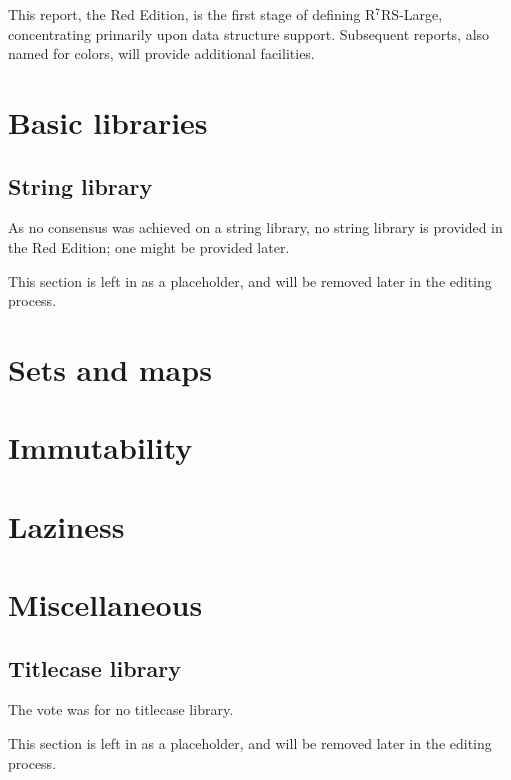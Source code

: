 This report, the Red Edition, is the first stage of defining
R$^7$RS-Large, concentrating primarily upon data structure
support. Subsequent reports, also named for colors, will provide
additional facilities.




\chapter{Basic libraries}\label{Basiclibraries}



\section{String library}
 As no consensus was achieved on a string library, no string
library is provided in the Red Edition; one might be provided later.

This section is left in as a placeholder, and will be removed later in
the editing process.
 

\chapter{Sets and maps}\label{Setsandmaps}




\chapter{Immutability}\label{Immutability}





\chapter{Laziness}




\chapter{Miscellaneous}




\section{Titlecase library}
 The vote was for no titlecase library. 

This section is left in as a placeholder, and will be removed later in
the editing process.

